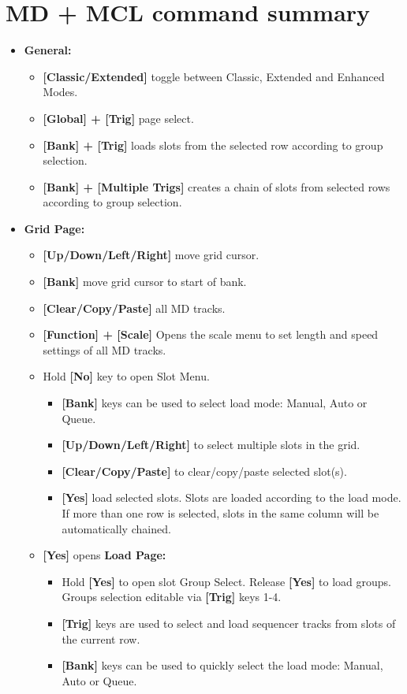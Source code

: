 \section{MD + MCL command summary}
\begin{itemize}
\item \textbf{General:}
   \begin{itemize}
      \item \textbf{[Classic/Extended] } toggle between Classic, Extended and Enhanced Modes.
      \item \textbf{[Global] + [Trig] } page select.
      \item \textbf{[Bank] + [Trig]} loads slots from the selected row according to group selection.
      \item \textbf{[Bank] + [Multiple Trigs]} creates a chain of slots from selected rows according to group selection.
   \end{itemize}

\item \textbf{Grid Page:}
    \begin{itemize}
      \item \textbf{[Up/Down/Left/Right]} move grid cursor.
      \item \textbf{[Bank]} move grid cursor to start of bank.
      \item \textbf{[Clear/Copy/Paste]} all MD tracks.
      \item \textbf{[Function] + [Scale]} Opens the scale menu to set length and speed settings of all MD tracks.
      \item Hold \textbf{[No]} key to open Slot Menu.
      \begin{itemize}
                \item \textbf{[Bank]} keys can be used to select load mode: Manual, Auto or Queue.
                \item \textbf{[Up/Down/Left/Right]} to select multiple slots in the grid.
                \item \textbf{[Clear/Copy/Paste]} to clear/copy/paste selected slot(s).
                \item \textbf{[Yes]} load selected slots. Slots are loaded according to the load mode. If more than one row is selected, slots in the same column will be automatically chained.
      \end{itemize}

\item \textbf{[Yes]} opens \textbf{Load Page:}
    \begin{itemize}
    \item Hold \textbf{[Yes]} to open slot Group Select. Release \textbf{[Yes]} to load groups. Groups selection editable via \textbf{[Trig]} keys 1-4.
    \item \textbf{[Trig]} keys are used to select and load sequencer tracks from slots of the current row.
    \item \textbf{[Bank]} keys can be used to quickly select the load mode: Manual, Auto or Queue.
    \end{itemize}
    

\end{itemize}
\end{itemize}
